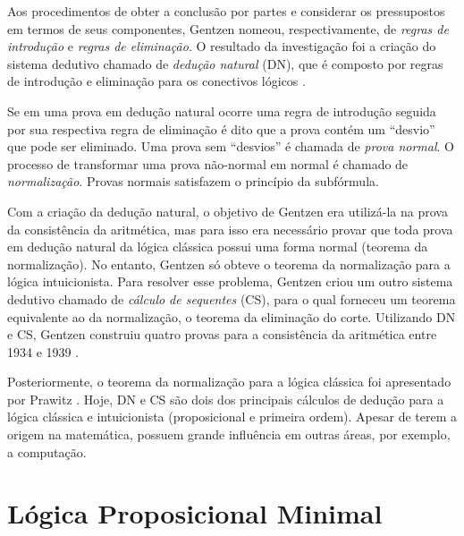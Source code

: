 \begin{prooftree}
\end{prooftree}

\begin{prooftree}
\end{prooftree}


\noindent Aos procedimentos de obter a conclusão por partes e considerar os pressupostos em termos de seus componentes, Gentzen nomeou, respectivamente, de \textit{regras de introdução} e \textit{regras de eliminação}. O resultado da investigação foi a criação do sistema dedutivo chamado de \textit{dedução natural}  (DN), que é composto por regras de introdução e eliminação para os conectivos lógicos \cite{GENTZEN34}.

Se em uma prova em dedução natural ocorre uma regra de introdução seguida por sua respectiva regra de eliminação é dito que a prova contém um ``desvio'' que pode ser eliminado. Uma prova sem ``desvios'' é chamada de \textit{prova normal}. O processo de transformar uma prova não-normal em normal é chamado de \textit{normalização}. Provas normais satisfazem o princípio da subfórmula.

Com a criação da dedução natural, o objetivo de Gentzen era utilizá-la na prova da consistência da aritmética, mas para isso era necessário provar que toda prova em dedução natural da lógica clássica possui uma forma normal (teorema da normalização). No entanto, Gentzen só obteve o teorema da normalização para a lógica intuicionista. Para resolver esse problema, Gentzen criou um outro sistema dedutivo chamado de \textit{cálculo de sequentes} (CS), para o qual forneceu um teorema equivalente ao da normalização, o teorema da eliminação do corte. Utilizando DN e CS, Gentzen construiu quatro provas para a consistência da aritmética entre 1934 e 1939 \cite{kahle2015gentzen}.

Posteriormente, o teorema da normalização para a lógica clássica foi apresentado por Prawitz \cite{Prawitz1965}. Hoje, DN e CS são dois dos principais cálculos de dedução para a lógica clássica e intuicionista (proposicional e primeira ordem). Apesar de terem a origem na matemática, possuem grande influência em outras áreas, por exemplo, a computação.

\section{Lógica Proposicional Minimal}
\label{sec:logica_proposicional_intuicionista}


